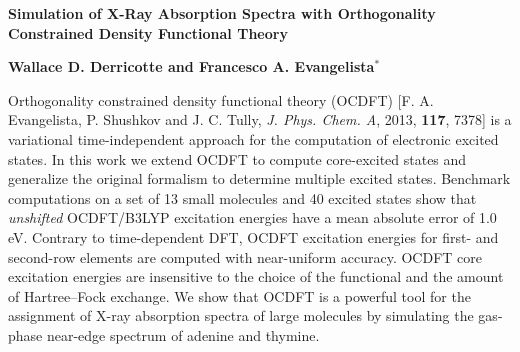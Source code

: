 \documentclass[12pt]{article}
\begin{document}
\noindent\LARGE{\textbf{Simulation of X-Ray Absorption Spectra with Orthogonality Constrained Density Functional Theory\dag
}} 
\vspace{0.6cm}

\noindent\large{\textbf{Wallace D. Derricotte and Francesco A. Evangelista$^{\ast}$}}\vspace{0.5cm}

%
\vspace{0.6cm}

\noindent \normalsize{Orthogonality constrained density functional theory (OCDFT) [F. A. Evangelista, P. Shushkov and J. C. Tully, \textit{J. Phys. Chem. A}, 2013, {\bf{117}}, 7378] is a variational time-independent approach for the computation of electronic excited states.
In this work we extend OCDFT  to compute core-excited states and generalize the original formalism to determine multiple excited states.
Benchmark computations on a set of 13 small molecules and 40 excited states show that \textit{unshifted} OCDFT/B3LYP excitation energies have a mean absolute error of 1.0 eV.
Contrary to time-dependent DFT, OCDFT excitation energies for first- and second-row elements are computed with near-uniform accuracy.
OCDFT core excitation energies are insensitive to the choice of the functional and the amount of Hartree--Fock exchange.
We show that OCDFT is a powerful tool for the assignment of X-ray absorption spectra of large molecules by simulating the gas-phase near-edge spectrum of adenine and thymine.}

\vspace{0.5cm}
\doublespacing
\newpage
\end{document}
